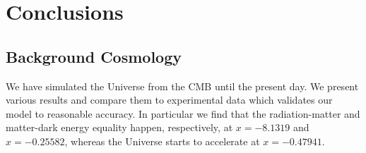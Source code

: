 \documentclass{aa}
\begin{document}
\section{Conclusions}

\subsection{Background Cosmology}
We have simulated the Universe from the CMB until the present day. We present various results and compare them to experimental data which validates our model to reasonable accuracy. In particular we find that the radiation-matter and matter-dark energy equality happen, respectively, at $x = -8.1319$ and $x = -0.25582$, whereas the Universe starts to accelerate at $x=-0.47941$.

\begin{acknowledgements}

\end{acknowledgements}

%
%



\end{document}
